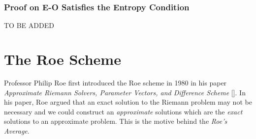 \documentclass[a4paper]{article}
\numberwithin{equation}{section}
\begin{document}
\subsubsection{Proof on E-O Satisfies the Entropy Condition}
TO BE ADDED

\section{The Roe Scheme}
Professor Philip Roe first introduced the Roe scheme in 1980 in his paper \textit{Approximate Riemann Solvers, Parameter Vectors, and Difference Scheme} []. In his paper, Roe argued that an exact solution to the Riemann problem may not be necessary and we could construct an \textit{approximate} solutions which are the \textit{exact} solutions to an approximate problem. This is the motive behind the \textit{Roe's Average}. 
\end{document}

